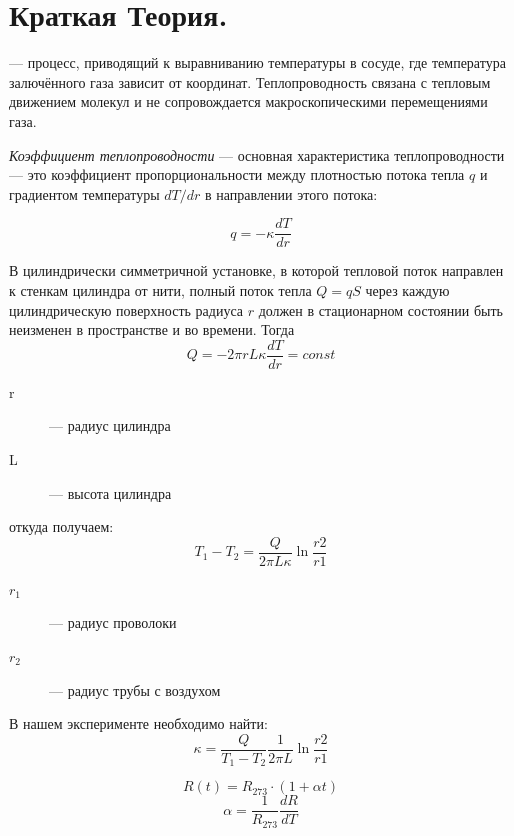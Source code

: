 \documentclass[a4paper,12pt]{article}
\begin{document}
\section{Краткая Теория.}
 --- процесс, приводящий к выравниванию температуры в сосуде, где температура залючённого газа зависит от координат. Теплопроводность связана с тепловым движением молекул и не сопровождается макроскопическими перемещениями газа. \par
{\it Коэффициент теплопроводности} --- основная характеристика теплопроводности --- это коэффициент пропорциональности между плотностью потока тепла $q$ и градиентом температуры $dT/dr$ в направлении этого потока:

\begin{equation}
  q = -\kappa \frac{dT}{dr}
\end{equation} \par

В цилиндрически симметричной установке, в которой тепловой поток направлен к стенкам цилиндра от нити, полный поток тепла $Q = qS$ через каждую цилиндрическую поверхность радиуса $r$ должен в стационарном состоянии быть неизменен в пространстве и во времени. Тогда
\begin{equation}
  Q = -2\pi r L \kappa \frac{dT}{dr} = const
\end{equation}
\begin{description}
  \item[r] --- радиус цилиндра
  \item[L] --- высота цилиндра
\end{description}

откуда получаем:
\begin{equation}
  T_1 - T_2 = \frac{Q}{2\pi L \kappa} \ln{\frac{r2}{r1}}
\end{equation}\par
\begin{description}
  \item[$r_1$] --- радиус проволоки
  \item[$r_2$] --- радиус трубы с воздухом
\end{description}

В нашем эксперименте необходимо найти:
\begin{equation}
  \kappa = \frac{Q}{T_1-T_2}\frac{1}{2\pi L}\ln\frac{r2}{r1}
\end{equation}

\begin{equation}
  R(t)=R_{273}\cdot(1+\alpha t)
\end{equation}
\begin{equation}
  \alpha=\frac{1}{R_{273}}\frac{dR}{dT}
\end{equation}
\end{document}

